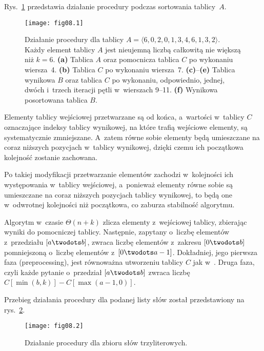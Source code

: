 
\exercise %
Rys.~\ref{fig:8.2-1} przedstawia działanie procedury  podczas sortowania tablicy~$A$.
\begin{figure}[ht]
	\begin{center}
		\texttt{[image: fig08.1]}
	\end{center}
	\caption{Działanie procedury  dla tablicy $A=\langle6,0,2,0,1,3,4,6,1,3,2\rangle$. Każdy element tablicy $A$ jest nieujemną liczbą całkowitą nie większą niż $k=6$. {\sffamily\bfseries(a)} Tablica $A$ oraz pomocnicza tablica $C$ po wykonaniu wiersza~4. {\sffamily\bfseries(b)} Tablica $C$ po wykonaniu wiersza~7. {\sffamily\bfseries(c)}--{\sffamily\bfseries(e)} Tablica wynikowa $B$ oraz tablica $C$ po wykonaniu, odpowiednio, jednej, dwóch i~trzech iteracji pętli  w~wierszach 9--11. {\sffamily\bfseries(f)} Wynikowa posortowana tablica $B$.} \label{fig:8.2-1}
\end{figure}

\exercise %
Elementy tablicy wejściowej przetwarzane są od końca, a~wartości w~tablicy $C$ oznaczające indeksy tablicy wynikowej, na które trafią wejściowe elementy, są systematycznie zmniejszane. A~zatem równe sobie elementy będą umieszczane na coraz niższych pozycjach w~tablicy wynikowej, dzięki czemu ich początkowa kolejność zostanie zachowana.

\exercise %
Po takiej modyfikacji przetwarzanie elementów zachodzi w~kolejności ich występowania w~tablicy wejściowej, a~ponieważ elementy równe sobie są  umieszczane na coraz niższych pozycjach tablicy wynikowej, to będą one w~odwrotnej kolejności niż początkowa, co zaburza stabilność algorytmu.

\exercise %
Algorytm w~czasie $\Theta(n+k)$ zlicza elementy z~wejściowej tablicy, zbierając wyniki do pomocniczej tablicy. Następnie, zapytany o~liczbę elementów z~przedziału $[a\twodots b]$, zwraca liczbę elementów z~zakresu $[0\twodots b]$ pomniejszoną o~liczbę elementów z~$[0\twodots a-1]$. Dokładniej, jego pierwsza faza (preprocessing), jest równoważna utworzeniu tablicy $C$ jak w~. Druga faza, czyli każde pytanie o~przedział $[a\twodots b]$ zwraca liczbę $C[\min(b,k)]-C[\max(a-1,0)]$.


\exercise %
Przebieg działania procedury  dla podanej listy słów został przedstawiony na rys.~\ref{fig:8.3-1}.
\begin{figure}[ht]
	\begin{center}
		\texttt{[image: fig08.2]}
	\end{center}
	\caption{Działanie procedury  dla zbioru słów trzyliterowych.} \label{fig:8.3-1}
\end{figure}

